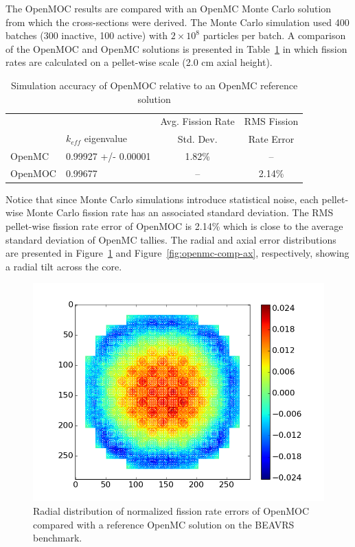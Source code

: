 \documentclass[12pt,twoside]{mitthesis-exec}
\begin{document}
\newpage
The OpenMOC results are compared with an OpenMC Monte Carlo solution from which the cross-sections were derived. The Monte Carlo simulation used 400 batches (300 inactive, 100 active) with $2 \times 10^8$ particles per batch. A comparison of the OpenMOC and OpenMC solutions is presented in Table~\ref{tab:openmc-comparison} in which fission rates are calculated on a pellet-wise scale (2.0 cm axial height).

\begin{table}[ht]
	\centering
	\caption{Simulation accuracy of OpenMOC relative to an OpenMC reference solution}
	\medskip
	\begin{tabular}{l|l|c|c}
		&                               & Avg. Fission Rate & RMS Fission \\
		& $k_{\textit{eff}}$ eigenvalue & Std. Dev.         & Rate Error \\
		\hline
		OpenMC  & 0.99927 +/- 0.00001  & 1.82\% & --     \\
		OpenMOC & 0.99677                         & --     & 2.14\% \\
		\hline
	\end{tabular}
	\label{tab:openmc-comparison}
\end{table}


Notice that since Monte Carlo simulations introduce statistical noise, each pellet-wise Monte Carlo fission rate has an associated standard deviation. The RMS pellet-wise fission rate error of OpenMOC is 2.14\% which is close to the average standard deviation of OpenMC tallies. The radial and axial error distributions are presented in Figure~\ref{fig:openmc-comp-rad} and Figure~\ref{fig:openmc-comp-ax}, respectively, showing a radial tilt across the core.


\begin{figure}[ht!]
	\centering
	\includegraphics[width=0.8\linewidth]{figures/results/full-core/radial_diff_v_openmc.png}
	\caption{Radial distribution of normalized fission rate errors of OpenMOC compared with a reference OpenMC solution on the BEAVRS benchmark.}
	\label{fig:openmc-comp-rad}
\end{figure}
\end{document}
